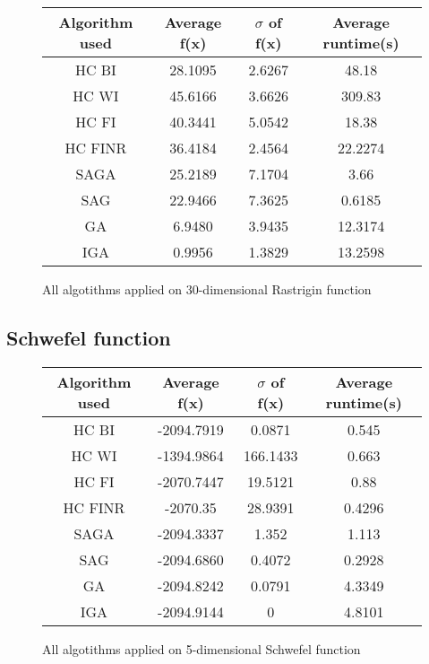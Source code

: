 \documentclass{article}
\begin{document}
\begin{figure}[H]
	\begin{tabular}{|c||c|c|c|} \hline
		Algorithm used & Average f(x) & $\sigma$ of f(x) & Average runtime(s) \\ \hline \hline
		HC BI & 28.1095 & 2.6267 & 48.18 \\ \hline
		HC WI & 45.6166 & 3.6626 & 309.83 \\ \hline
		HC FI & 40.3441 & 5.0542 & 18.38 \\ \hline
		HC FINR & 36.4184 & 2.4564 & 22.2274 \\ \hline
		SAGA & 25.2189 & 7.1704 & 3.66 \\ \hline
		SAG & 22.9466 & 7.3625 & 0.6185 \\ \hline
        GA & 6.9480 & 3.9435 & 12.3174 \\ \hline
		IGA & 0.9956 & 1.3829 & 13.2598 \\ \hline
\end{tabular}
\caption{All algotithms applied on 30-dimensional Rastrigin function}
\end{figure}

\subsection{Schwefel function}

\begin{figure}[H]
	\begin{tabular}{|c||c|c|c|} \hline
		Algorithm used & Average f(x) & $\sigma$ of f(x) & Average runtime(s) \\ \hline \hline
		HC BI & -2094.7919 & 0.0871 & 0.545 \\ \hline
		HC WI & -1394.9864 & 166.1433 & 0.663 \\ \hline
		HC FI & -2070.7447 & 19.5121 & 0.88 \\ \hline
		HC FINR & -2070.35 & 28.9391 & 0.4296 \\ \hline
		SAGA & -2094.3337 & 1.352 & 1.113 \\ \hline
		SAG & -2094.6860 & 0.4072 & 0.2928 \\ \hline
        GA & -2094.8242 & 0.0791 & 4.3349 \\ \hline
		IGA & -2094.9144 & 0 & 4.8101 \\ \hline
\end{tabular}
\caption{All algotithms applied on 5-dimensional Schwefel function}
\end{figure}
\end{document}
